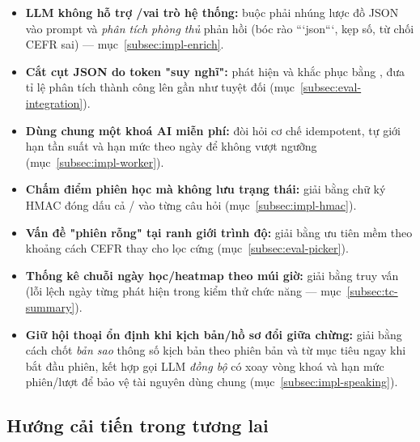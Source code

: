 \begin{itemize}
  \item \textbf{LLM không hỗ trợ /vai trò hệ thống:} buộc
        phải nhúng lược đồ JSON vào prompt và \textit{phân tích phòng thủ}
        phản hồi (bóc rào ```json```, kẹp số, từ chối CEFR sai) ---
        mục~\ref{subsec:impl-enrich}.
  \item \textbf{Cắt cụt JSON do token "suy nghĩ":} phát hiện và khắc phục bằng
        , đưa tỉ lệ phân tích thành
        công lên gần như tuyệt đối (mục~\ref{subsec:eval-integration}).
  \item \textbf{Dùng chung một khoá AI miễn phí:} đòi hỏi cơ chế idempotent,
        tự giới hạn tần suất và hạn mức theo ngày để không vượt ngưỡng
        (mục~\ref{subsec:impl-worker}).
  \item \textbf{Chấm điểm phiên học mà không lưu trạng thái:} giải bằng chữ ký
        HMAC đóng dấu cả / vào từng câu hỏi
        (mục~\ref{subsec:impl-hmac}).
  \item \textbf{Vấn đề "phiên rỗng" tại ranh giới trình độ:} giải bằng ưu tiên
        mềm theo khoảng cách CEFR thay cho lọc cứng
        (mục~\ref{subsec:eval-picker}).
  \item \textbf{Thống kê chuỗi ngày học/heatmap theo múi giờ:} giải bằng truy
        vấn  (lỗi lệch ngày từng phát hiện trong kiểm thử
        chức năng --- mục~\ref{subsec:tc-summary}).
  \item \textbf{Giữ hội thoại ổn định khi kịch bản/hồ sơ đổi giữa chừng:} giải
        bằng cách chốt \textit{bản sao} thông số kịch bản theo phiên bản và từ
        mục tiêu ngay khi bắt đầu phiên, kết hợp gọi LLM \textit{đồng bộ} có
        xoay vòng khoá và hạn mức phiên/lượt để bảo vệ tài nguyên dùng chung
        (mục~\ref{subsec:impl-speaking}).
\end{itemize}

\subsection{Hướng cải tiến trong tương lai}
\label{subsec:huong-phat-trien}

